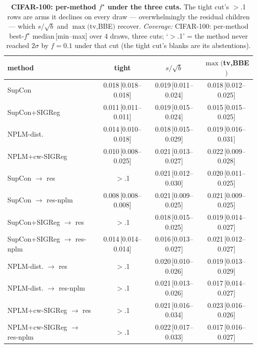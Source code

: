 \begin{table}[t]
\centering
\footnotesize
\begin{tabular}{lccc}
\toprule
method & tight & $s/\sqrt{b}$ & $\max($tv,BBE$)$ \\
\midrule
SupCon & 0.018\,[0.018--0.018] & 0.019\,[0.011--0.024] & 0.018\,[0.012--0.025] \\
SupCon+SIGReg & 0.011\,[0.011--0.011] & 0.019\,[0.015--0.024] & 0.015\,[0.015--0.025] \\
NPLM-dist. & 0.014\,[0.010--0.018] & 0.018\,[0.015--0.029] & 0.019\,[0.016--0.031] \\
NPLM+cw-SIGReg & 0.010\,[0.008--0.025] & 0.021\,[0.013--0.027] & 0.022\,[0.009--0.028] \\
\quad SupCon $\to$ res & $>$.1 & 0.021\,[0.012--0.030] & 0.020\,[0.011--0.025] \\
\quad SupCon $\to$ res-nplm & 0.008\,[0.008--0.008] & 0.021\,[0.009--0.025] & 0.021\,[0.009--0.025] \\
\quad SupCon+SIGReg $\to$ res & $>$.1 & 0.018\,[0.015--0.025] & 0.019\,[0.014--0.027] \\
\quad SupCon+SIGReg $\to$ res-nplm & 0.014\,[0.014--0.014] & 0.016\,[0.013--0.027] & 0.021\,[0.012--0.027] \\
\quad NPLM-dist. $\to$ res & $>$.1 & 0.020\,[0.010--0.026] & 0.019\,[0.013--0.029] \\
\quad NPLM-dist. $\to$ res-nplm & $>$.1 & 0.021\,[0.013--0.026] & 0.017\,[0.014--0.027] \\
\quad NPLM+cw-SIGReg $\to$ res & $>$.1 & 0.021\,[0.016--0.034] & 0.023\,[0.016--0.026] \\
\quad NPLM+cw-SIGReg $\to$ res-nplm & $>$.1 & 0.022\,[0.017--0.033] & 0.017\,[0.016--0.027] \\
\bottomrule
\end{tabular}
\caption{\textbf{CIFAR-100: per-method $f^\star$ under the three cuts.}  The tight cut's $>$.1 rows are arms it declines on every draw --- overwhelmingly the residual children --- which $s/\sqrt{b}$ and $\max($tv,BBE$)$ recover. \emph{Coverage:} CIFAR-100: per-method best-$f^\star$ median\,[min--max] over 4 draws, three cuts; `$>$.1' = the method never reached $2\sigma$ by $f{=}0.1$ under that cut (the tight cut's blanks are its abstentions).}
\label{tab:cut_perarm_cifar100}
\end{table}
